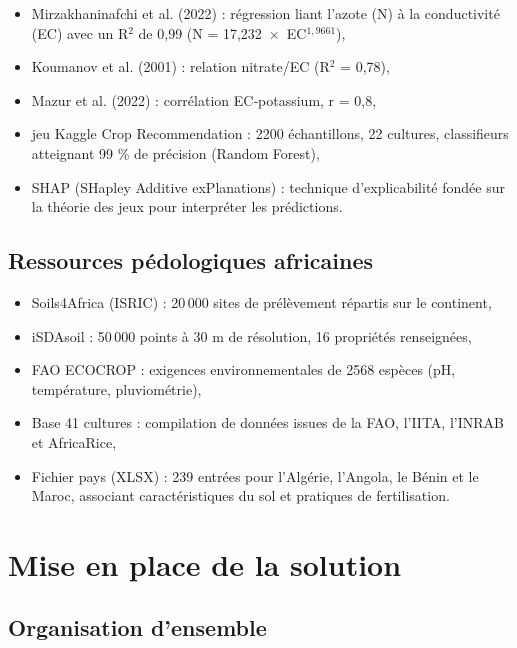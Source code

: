 \documentclass[a4paper,12pt,openany,titlepage]{scrartcl}
\begin{document}
\begin{itemize}[nosep]
    \item Mirzakhaninafchi et al. (2022) : régression liant l’azote (N) à la conductivité (EC) avec un R$^2$ de 0,99 (N = 17,232~$\times$~EC$^{1,9661}$),
    \item Koumanov et al. (2001) : relation nitrate/EC (R$^2$ = 0,78),
    \item Mazur et al. (2022) : corrélation EC‑potassium, r = 0,8,
    \item jeu Kaggle Crop Recommendation : 2200 échantillons, 22 cultures, classifieurs atteignant 99 \% de précision (Random Forest),
    \item SHAP (SHapley Additive exPlanations) : technique d’explicabilité fondée sur la théorie des jeux pour interpréter les prédictions.
\end{itemize}

\subsection{Ressources pédologiques africaines}
\begin{itemize}[nosep]
    \item Soils4Africa (ISRIC) : 20\,000 sites de prélèvement répartis sur le continent,
    \item iSDAsoil : 50\,000 points à 30 m de résolution, 16 propriétés renseignées,
    \item FAO ECOCROP : exigences environnementales de 2568 espèces (pH, température, pluviométrie),
    \item Base 41 cultures : compilation de données issues de la FAO, l’IITA, l’INRAB et AfricaRice,
    \item Fichier pays (XLSX) : 239 entrées pour l’Algérie, l’Angola, le Bénin et le Maroc, associant caractéristiques du sol et pratiques de fertilisation.
\end{itemize}

\newpage

\section{Mise en place de la solution}

\subsection{Organisation d’ensemble}
\end{document}
